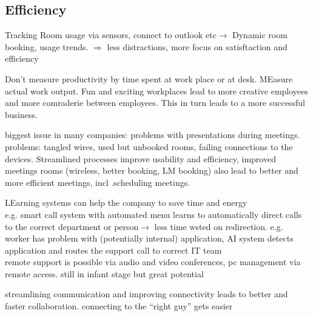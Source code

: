 \subsection{Efficiency}
Tracking Room usage via sensors, connect to outlook etc\(\rightarrow\) Dynamic room booking, usage trends. \(\Rightarrow\) less distractions, more focus on satisftaction and efficiency\cite{iotagenda}

Don't measure productivity by time spent at work place or at desk. MEasure actual work output. Fun and exciting workplaces lead to more creative employees and more comraderie between employees. This in turn leads to a more successful business. 
\cite{roomzilla3}

biggest issue in many companies: problems with presentations during meetings. problems: tangled wires, used but unbooked rooms, failing connections to the devices. Streamlined processes improve usability and efficiency, improved meetings rooms (wireless, better booking, LM booking) also lead to better and more efficient meetings, incl .scheduling meetings. \cite{roomzilla3}

LEarning systems can help the company to save time and energy\\
e.g. smart call system with automated menu learns to automatically direct calls to the correct department or person\(\rightarrow\) less time wsted on redirection. e.g. worker has problem with (potentially internal) application, AI system detects application and routes the support call to correct IT team\\
remote support is possible via audio and video conferences, pc management via remote access. still in infant stage but great potential \cite{hbcommunications}

streamlining communication and improving connectivity leads to better and faster collaboration. connecting to the ``right guy'' gets easier \cite{hbcommunications}
